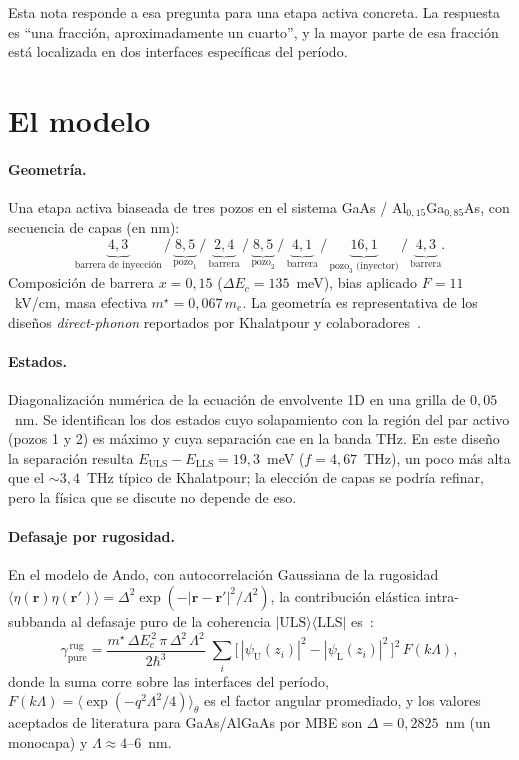 \documentclass[11pt,a4paper]{article}
\begin{document}
Esta nota responde a esa pregunta para una etapa activa concreta. La respuesta
es ``una fracción, aproximadamente un cuarto'', y la mayor parte de esa
fracción está localizada en dos interfaces específicas del período.

\section{El modelo}

\paragraph{Geometría.} Una etapa activa biaseada de tres pozos en el sistema
GaAs / Al$_{0{,}15}$Ga$_{0{,}85}$As, con secuencia de capas (en nm):
\[
\underbrace{4{,}3}_{\text{barrera de inyección}} \,\big/\,
\underbrace{8{,}5}_{\text{pozo}_1} \,\big/\,
\underbrace{2{,}4}_{\text{barrera}} \,\big/\,
\underbrace{8{,}5}_{\text{pozo}_2} \,\big/\,
\underbrace{4{,}1}_{\text{barrera}} \,\big/\,
\underbrace{16{,}1}_{\text{pozo}_3 \text{ (inyector)}} \,\big/\,
\underbrace{4{,}3}_{\text{barrera}}.
\]
Composición de barrera $x = 0{,}15$ ($\Delta E_c = 135$~meV), bias aplicado
$F = 11$~kV/cm, masa efectiva $m^\star = 0{,}067\,m_e$. La geometría es
representativa de los diseños \emph{direct-phonon} reportados por Khalatpour
y colaboradores~\cite{khalatpour2021,khalatpour2024}.

\paragraph{Estados.} Diagonalización numérica de la ecuación de envolvente 1D
en una grilla de $0{,}05$~nm. Se identifican los dos estados cuyo solapamiento
con la región del par activo (pozos 1 y 2) es máximo y cuya separación cae en
la banda THz. En este diseño la separación resulta $E_{\mathrm{ULS}} -
E_{\mathrm{LLS}} = 19{,}3$~meV ($f = 4{,}67$~THz), un poco más alta que el
$\sim\!3{,}4$~THz típico de Khalatpour; la elección de capas se podría
refinar, pero la física que se discute no depende de eso.

\paragraph{Defasaje por rugosidad.} En el modelo de Ando, con
autocorrelación Gaussiana de la rugosidad
$\langle\eta(\mathbf{r})\eta(\mathbf{r}')\rangle = \Delta^2 \exp(-|\mathbf{r}-\mathbf{r}'|^2/\Lambda^2)$,
la contribución elástica intra-subbanda al defasaje puro de la coherencia
$|\mathrm{ULS}\rangle\langle\mathrm{LLS}|$ es~\cite{unuma2003,khurgin2008}:
\begin{equation}
\gamma_{\mathrm{pure}}^{\,\mathrm{rug}}
= \frac{m^\star\,\Delta E_c^{\,2}\,\pi\,\Delta^{2}\,\Lambda^{2}}{2\hbar^{3}}\;
\sum_{i}\bigl[\,|\psi_{\mathrm{U}}(z_i)|^{2}-|\psi_{\mathrm{L}}(z_i)|^{2}\,\bigr]^{2}\,F(k\Lambda),
\label{eq:gamma_pure}
\end{equation}
donde la suma corre sobre las interfaces del período, $F(k\Lambda) = \langle
\exp(-q^{2}\Lambda^{2}/4)\rangle_{\theta}$ es el factor angular promediado, y
los valores aceptados de literatura para GaAs/AlGaAs por MBE son
$\Delta = 0{,}2825$~nm (un monocapa) y $\Lambda \approx 4$--$6$~nm.
\end{document}
